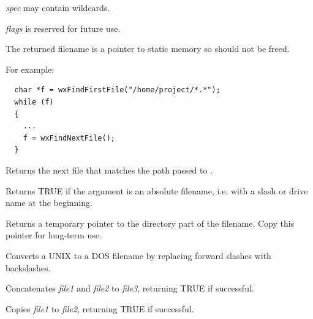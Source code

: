 {\it spec} may contain wildcards.

{\it flags} is reserved for future use.

The returned filename is a pointer to static memory so should
not be freed.

For example:

\begin{verbatim}
  char *f = wxFindFirstFile("/home/project/*.*");
  while (f)
  {
    ...
    f = wxFindNextFile();
  }
\end{verbatim}

\label{wxfindnextfile}


Returns the next file that matches the path passed to .



Returns TRUE if the argument is an absolute filename, i.e. with a slash
or drive name at the beginning.



Returns a temporary pointer to the directory part of the filename. Copy this
pointer for long-term use.



Converts a UNIX to a DOS filename by replacing forward
slashes with backslashes.



Concatenates {\it file1} and {\it file2} to {\it file3}, returning
TRUE if successful.



Copies {\it file1} to {\it file2}, returning TRUE if successful.

\label{wxgethostname}


